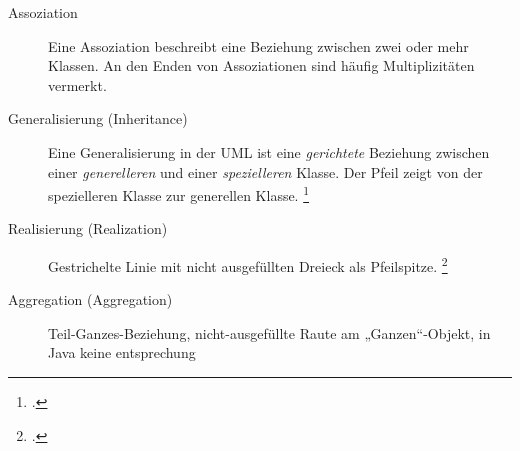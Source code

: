 \documentclass{lehramt-informatik-haupt}
\begin{document}
\begin{description}
%

\item[Assoziation] Eine Assoziation beschreibt eine Beziehung zwischen
zwei oder mehr Klassen. An den Enden von Assoziationen sind häufig
Multiplizitäten vermerkt. 

\begin{center}
\end{center}

%

\item[Generalisierung (Inheritance)]

Eine Generalisierung in der UML ist
eine \emph{gerichtete} Beziehung zwischen einer \emph{generelleren} und
einer \emph{spezielleren} Klasse. Der Pfeil zeigt von der spezielleren
Klasse zur generellen Klasse.
\footcite[Kapitel 6.4.6 Generalisierung, Seite 135]{rupp}

\begin{center}
\end{center}

\item[Realisierung (Realization)] Gestrichelte Linie mit nicht
ausgefüllten Dreieck als Pfeilspitze. 
\footcite[Kapitel 6.4.13, Seite 164]{rupp}

\begin{center}
\end{center}

%

\item[Aggregation (Aggregation)]

Teil-Ganzes-Beziehung, nicht-ausgefüllte Raute am „Ganzen“-Objekt,
in Java keine entsprechung

\begin{center}
\end{center}


\end{description}
\end{document}
